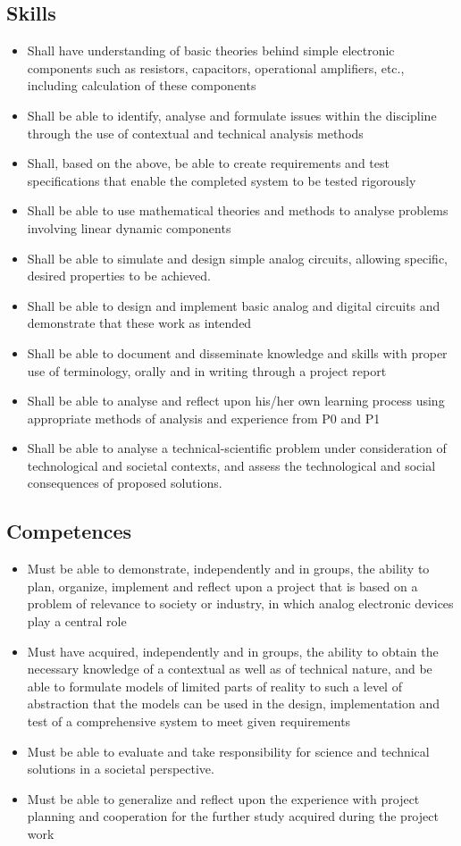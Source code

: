 \subsection{Skills}
\begin{itemize}
	\item Shall have understanding of basic theories behind simple electronic components such as resistors, capacitors, operational amplifiers, etc., including calculation of these components
	\item Shall be able to identify, analyse and formulate issues within the discipline through the use of contextual and technical analysis methods
	\item Shall, based on the above, be able to create requirements and test specifications that enable the completed system to be tested rigorously
	\item Shall be able to use mathematical theories and methods to analyse problems involving linear dynamic components
	\item Shall be able to simulate and design simple analog circuits, allowing specific, desired properties to be achieved.
	\item Shall be able to design and implement basic analog and digital circuits and demonstrate that these work as intended
	\item Shall be able to document and disseminate knowledge and skills with proper use of terminology, orally and in writing through a project report
	\item Shall be able to analyse and reflect upon his/her own learning process using appropriate methods of analysis and experience from P0 and P1
	\item Shall be able to analyse a technical-scientific problem under consideration of technological and societal contexts, and assess the technological and social consequences of proposed solutions.
\end{itemize}

\subsection{Competences}
\begin{itemize}
	\item Must be able to demonstrate, independently and in groups, the ability to plan, organize, implement and reflect upon a project that is based on a problem of relevance to society or industry, in which analog electronic devices play a central role
	\item Must have acquired, independently and in groups, the ability to obtain the necessary knowledge of a contextual as well as of technical nature, and be able to formulate models of limited parts of reality to such a level of abstraction that the models can be used in the design, implementation and test of a comprehensive system to meet given requirements
	\item Must be able to evaluate and take responsibility for science and technical solutions in a societal perspective.
	\item Must be able to generalize and reflect upon the experience with project planning and cooperation for the further study acquired during the project work
\end{itemize}
